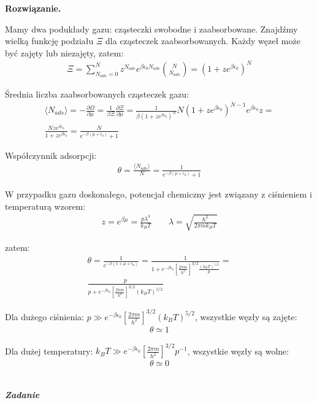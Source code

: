 \documentclass[11pt,a4paper]{article}
\newcounter{zadanie}\newcommand{\zadanie}[1][]{\addtocounter{zadanie}{1} ~\\ {\bf \emph{Zadanie \arabic{zadanie} #1 }} \\}
\newenvironment{solution}{\vspace{1cm} \par\textbf{Rozwiązanie.} \vspace{1cm}}{}
\begin{document}
\begin{solution}

Mamy dwa podukłady gazu: cząsteczki swobodne i zaabsorbowane. Znajdźmy wielką 
funkcję podziału $\Xi$ dla cząsteczek zaabsorbowanych. 
Każdy węzeł może być zajęty lub niezajęty, zatem:
\begin{align*}
  \Xi = \sum_{N_{ads}=0}^{N} z^{N_{ads}} e^{\beta \epsilon_0 N_{ads}} \binom{N}{N_{ads}} = 
  (1 + z e^{\beta \epsilon_0})^N
\end{align*}

Średnia liczba zaabsorbowanych cząsteczek gazu:
\begin{align*}
  \langle N_{ads} \rangle = -\frac{\partial \Omega}{\partial \mu} = 
  \frac{1}{\beta \Xi} \frac{\partial \Xi}{\partial \mu} = 
  \frac{1}{\beta (1 + z e^{\beta \epsilon_0})^N} N (1 + z e^{\beta \epsilon_0})^{N-1} e^{\beta \epsilon_0} z = \\
  \frac{N z e^{\beta \epsilon_0}}{1 + z e^{\beta \epsilon_0}} = 
  \frac{N}{e^{-\beta (\mu + \epsilon_0)} + 1}
\end{align*}

Współczynnik adsorpcji:
\begin{align*}
  \theta = \frac{\langle N_{ads} \rangle}{N} = 
  \frac{1}{e^{-\beta (\mu + \epsilon_0)} + 1}
\end{align*}

W przypadku gazu doskonałego, potencjał chemiczny jest związany 
z ciśnieniem i temperaturą wzorem:
\begin{align*}
  z = e^{\beta \mu} = \frac{p \lambda^3}{k_B T} \qquad \lambda = \sqrt{\frac{h^2}{2\pi m k_B T}}
\end{align*}

zatem:
\begin{align*}
  \theta = \frac{1}{e^{-\beta (1 + \mu + \epsilon_0)}} = 
  \frac{1}{1 + e^{-\beta \epsilon_0} \left[\frac{2\pi m}{h^{2}}\right]^{3/2} \frac{(k_B T)^{5/2}}{p}} = \\
  \frac{p}{p + e^{-\beta \epsilon_0} \left[\frac{2\pi m}{h^{2}}\right]^{3/2} (k_B T)^{5/2}}
\end{align*}

Dla dużego ciśnienia: $ p \gg e^{-\beta \epsilon_0} \left[\frac{2\pi m}{h^{2}}\right]^{3/2} (k_B T)^{5/2}$,
wszystkie węzły są zajęte:
\begin{align*}
  \theta \simeq 1
\end{align*}

Dla dużej temperatury: 
$k_B T \gg e^{-\beta \epsilon_0} \left[\frac{2\pi m}{h^{2}}\right]^{3/2}p^{-1}$,
wszystkie węzły są wolne:
\begin{align*}
  \theta \simeq 0
\end{align*}


\newpage   
\end{solution}
\zadanie[]
\end{document}
